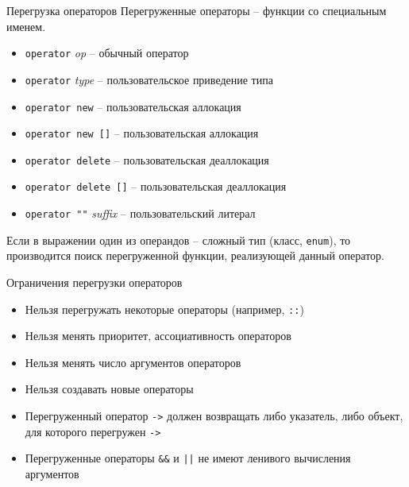 \documentclass[unknownkeysallowed,xcolor=table]{beamer}
\begin{document}
\begin{frame}{Перегрузка операторов}
Перегруженные операторы -- функции со специальным именем.

\vspace{1em}

\begin{itemize}
  \item \lstinline{operator} \emph{op} -- обычный оператор
  \item \lstinline{operator} \emph{type} -- пользовательское приведение типа
  \item \lstinline{operator new} -- пользовательская аллокация
  \item \lstinline{operator new []} -- пользовательская аллокация
  \item \lstinline{operator delete} -- пользовательская деаллокация
  \item \lstinline{operator delete []} -- пользовательская деаллокация
  \item \lstinline{operator ""} \emph{suffix} -- пользовательский литерал
\end{itemize}

\vspace{1em}

Если в выражении один из операндов -- сложный тип (класс, \lstinline{enum}), то производится поиск перегруженной функции, реализующей данный оператор.

\end{frame}

\begin{frame}{Ограничения перегрузки операторов}

\begin{itemize}
  \item Нельзя перегружать некоторые операторы (например, \lstinline{::}) \vspace{0.5em}
  \item Нельзя менять приоритет, ассоциативность операторов \vspace{0.5em}
  \item Нельзя менять число аргументов операторов \vspace{0.5em}
  \item Нельзя создавать новые операторы \vspace{0.5em}
  \item Перегруженный оператор \lstinline{->} должен возвращать либо указатель, либо объект, для которого перегружен \lstinline{->} \vspace{0.5em}
  \item Перегруженные операторы \lstinline{&&} и \lstinline{||} не имеют ленивого вычисления аргументов
\end{itemize}

\end{frame}
\end{document}
